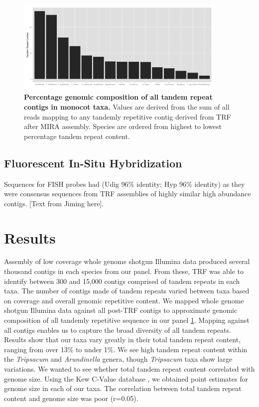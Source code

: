 \documentclass[10pt,letterpaper]{article}
\begin{document}
\begin{figure}[h]
\begin{center}
\includegraphics[width=4in]{total_trf.png}
\end{center}
\caption{{\bf Percentage genomic composition of all tandem repeat contigs in monocot taxa.}
Values are derived from the sum of all reads mapping to any tandemly repetitive contig derived from TRF after MIRA assembly.  
Species are ordered from highest to lowest percentage tandem repeat content.}
\label{totaltrf}
\end{figure}

\subsection*{Fluorescent In-Situ Hybridization}
Sequences for FISH probes had (Udig 96\% identity; Hyp 96\% identity) as they were consensus sequences from TRF assemblies of highly similar high abundance contigs.
[Text from Jiming here].


\section*{Results}
Assembly of low coverage whole genome shotgun Illumina data produced several thousand contigs in each species from our panel.
From these, TRF was able to identify between 300 and 15,000 contigs comprised of tandem repeats in each taxa.
The number of contigs made of tandem repeats varied between taxa based on coverage and overall genomic repetitive content.
We mapped whole genome shotgun Illumina data against all post-TRF contigs to approximate genomic composition of all tandemly repetitive sequence in our panel \ref{totaltrf}.
Mapping against all contigs enables us to capture the broad diversity of all tandem repeats.
Results show that our taxa vary greatly in their total tandem repeat content, ranging from over 13\% to under 1\%.
We see high tandem repeat content within the \emph{Tripsacum} and \emph{Arundinella} genera, though \emph{Tripsacum} taxa show large variations.
We wanted to see whether total tandem repeat content correlated with genome size.
Using the Kew C-Value database \cite{kewc}, we obtained point estimates for genome size in each of our taxa.
The correlation between total tandem repeat content and genome size was poor (r=0.05).
\end{document}
